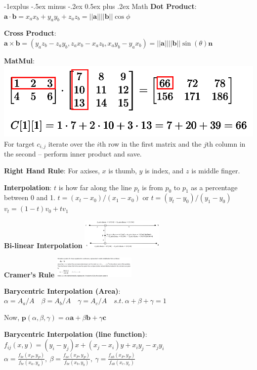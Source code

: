 \documentclass[letterpaper, 8pt]{extarticle}
\makeatletter
\renewcommand{\section}{\@startsection{section}{1}{0mm}%
                                {-1explus -.5ex minus -.2ex}%
                                {0.5ex plus .2ex}%
                                {\normalfont\small\bfseries}}
\makeatother
\begin{document}
\begin{multicols*}{4}

\section{Math}
\textbf{Dot Product}:
\(
\mathbf{a} \cdot \mathbf{b}
= x_a x_b + y_a y_b + z_a z_b
= ||\mathbf{a}|| ||\mathbf{b}|| \cos \phi
\)

\textbf{Cross Product}:
\(
\mathbf{a} \times \mathbf{b}
= (y_a z_b - z_a y_b, z_a x_b - x_a z_b, x_a y_b - y_a x_b)
= ||\mathbf{a}|| ||\mathbf{b}|| \sin(\theta) \mathbf{n}
\)

\textbf{MatMul}:\\
\includegraphics[width=0.5\linewidth]{matrix-multiply-a.png}
For target $c_{i,j}$ iterate over the $i$th row in the first matrix and the $j$th column in the second -- perform inner product and save.

\textbf{Right Hand Rule}:
For axises, $x$ is thumb, $y$ is index, and $z$ is middle finger.

\textbf{Interpolation}:
\(t\) is how far along the line \(p_t\) is from \(p_0\) to \(p_1\) as a percentage between 0 and 1.
\(
t = (x_t - x_0) / (x_1 - x_0)
\text{ or }
t = (y_t - y_0) / (y_1 - y_0)
\)
\(
v_t = (1-t) v_0 + t v_1
\)

\textbf{Bi-linear Interpolation}
\includegraphics[width=4cm]{bilinear-interpolation.png}

\textbf{Cramer's Rule}
\includegraphics[width=4cm]{cramer.png}

\textbf{Barycentric Interpolation (Area)}:
\(
\alpha = A_a / A \quad
\beta = A_b / A \quad
\gamma = A_c / A \quad
s.t.\ \alpha + \beta + \gamma = 1
\)

Now,
\(
\mathbf{p}(\alpha, \beta, \gamma)
= \alpha \mathbf{a} + \beta \mathbf{b} + \gamma \mathbf{c}
\)

\textbf{Barycentric Interpolation (line function)}:
$f_{ij}(x, y) = (y_i - y_j) x + (x_j - x_i)y + x_i y_j - x_j y_i$ \\
$\alpha = \frac{f_{bc}(x_P, y_P)}{f_{bc}(x_a, y_a)},\
\beta = \frac{f_{ac}(x_P, y_P)}{f_{bc}(x_b, y_b)},\
\gamma = \frac{f_{ab}(x_P, y_P)}{f_{ab}(x_c, y_c)}$


\end{multicols*}
\end{document}
